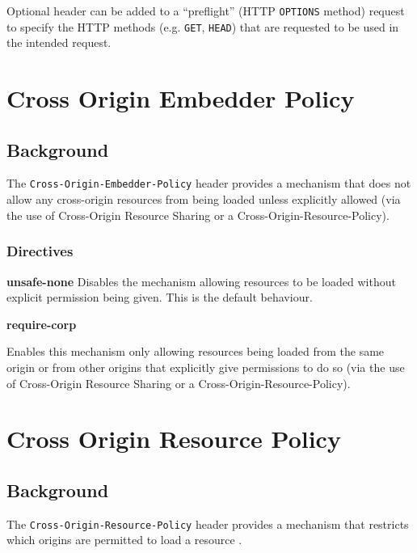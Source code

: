 \documentclass{mscreport}
\begin{document}
\vspace{0.3cm} \noindent
Optional header can be added to a ``preflight'' (HTTP \texttt{OPTIONS} method) request to specify the HTTP methods (e.g. \texttt{GET}, \texttt{HEAD}) that are requested to be used in the intended request.

\newpage


\section{Cross Origin Embedder Policy}
\label{section:coep}

\subsection{Background}

The \texttt{Cross-Origin-Embedder-Policy} header provides a mechanism that does not allow any cross-origin resources from being loaded unless explicitly allowed (via the use of Cross-Origin Resource Sharing or a Cross-Origin-Resource-Policy).

\subsubsection{Directives}
\textbf{unsafe-none}
Disables the mechanism allowing resources to be loaded without explicit permission being given. This is the default behaviour.

\vspace{0.7cm} \noindent
\textbf{require-corp}

\vspace{0.3cm} \noindent
Enables this mechanism only allowing resources being loaded from the same origin or from other origins that explicitly give permissions to do so (via the use of Cross-Origin Resource Sharing or a Cross-Origin-Resource-Policy).

\newpage


\section{Cross Origin Resource Policy}
\label{section:corp}

\subsection{Background}

The \texttt{Cross-Origin-Resource-Policy} header provides a mechanism that restricts which origins are permitted to load a resource \cite{Apple_undated-au}.
\end{document}
